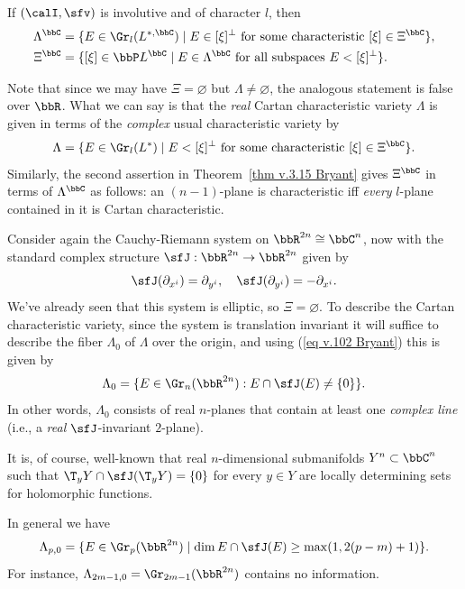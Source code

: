 \begin{thm}\label{thm v.3.15 Bryant}
    If $(\calI,\sfv)$ is involutive and of character $l$, then 
    \begin{align}
        \Lambda^\bbC&=\{E\in \Gr_l(L^{\ast,\bbC})\mid E\in [\xi]^\perp \text{ for some characteristic }[\xi]\in\Xi^\bbC\},\\
        \Xi^\bbC&=\{[\xi]\in\bbP L^\bbC\mid E\in \Lambda^\bbC \text{ for all subspaces }E<[\xi]^\perp\}.
    \end{align}
\end{thm}

Note that since we may have $\Xi=\varnothing$ but $\Lambda\neq \varnothing$, the analogous statement is false over $\bbR$. What we can say is that the \emph{real} Cartan characteristic variety $\Lambda$ is given in terms of the \emph{complex} usual characteristic variety by 
\[\Lambda=\{E\in\Gr_l(L^\ast)\mid E<[\xi]^\perp \text{ for some characteristic }[\xi]\in\Xi^\bbC\}.\label{eq v.102 Bryant}\]
Similarly, the second assertion in Theorem~\ref{thm v.3.15 Bryant} gives $\Xi^\bbC$ in terms of $\Lambda^\bbC$ as follows: an $(n-1)$-plane is characteristic iff \emph{every} $l$-plane contained in it is Cartan characteristic.

\begin{example}
    Consider again the Cauchy-Riemann system on $\bbR^{2n}\cong \bbC^n$, now with the standard complex structure $\sfJ:\bbR^{2n}\to \bbR^{2n}$ given by 
    \[\sfJ(\partial_{x^i})=\partial_{y^i},\quad \sfJ(\partial_{y^i})=-\partial_{x^i}.\]
    We've already seen that this system is elliptic, so $\Xi=\varnothing$. To describe the Cartan characteristic variety, since the system is translation invariant it will suffice to describe the fiber $\Lambda_0$ of $\Lambda$ over the origin, and using (\ref{eq v.102 Bryant}) this is given by 
    \[\Lambda_0=\{E\in\Gr_n(\bbR^{2n}):E\cap \sfJ(E)\neq \{0\}\}.\]
    In other words, $\Lambda_0$ consists of real $n$-planes that contain at least one \emph{complex line} (i.e., a \emph{real} $\sfJ$-invariant $2$-plane). 

    It is, of course, well-known that real $n$-dimensional submanifolds $Y^n\subset \bbC^n$ such that $\T_y Y\cap \sfJ(\T_y Y)=\{0\}$ for every $y\in Y$ are locally determining sets for holomorphic functions. 

    In general we have 
    \[\Lambda_{p,0}=\{E\in\Gr_p(\bbR^{2n})\mid \dim E\cap \sfJ(E)\geq \max(1,2(p-m)+1)\}.\]
    For instance, $\Lambda_{2m-1,0}=\Gr_{2m-1}(\bbR^{2n})$ contains no information.
\end{example}

